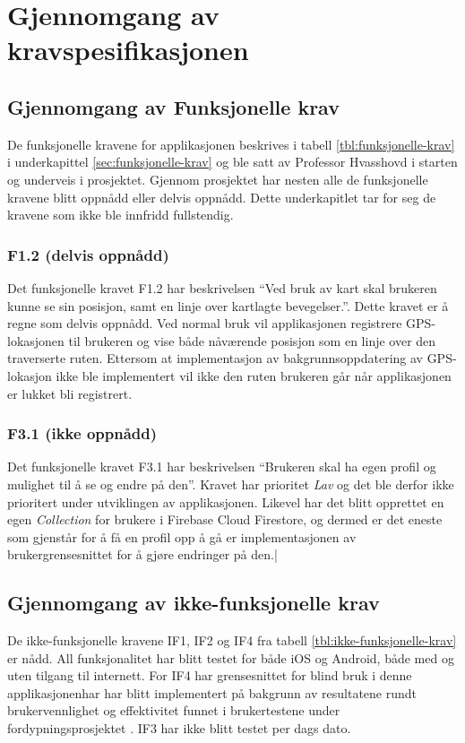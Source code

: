 \chapter{Gjennomgang av kravspesifikasjonen}

\section{Gjennomgang av Funksjonelle krav}
De funksjonelle kravene for applikasjonen beskrives i tabell \ref{tbl:funksjonelle-krav} i underkapittel \ref{sec:funksjonelle-krav}  og ble satt av Professor Hvasshovd i starten og underveis i prosjektet. Gjennom prosjektet har nesten alle de funksjonelle kravene blitt oppnådd eller delvis oppnådd. Dette underkapitlet tar for seg de kravene som ikke ble innfridd fullstendig.

\subsection{F1.2 (delvis oppnådd)}
Det funksjonelle kravet F1.2 har beskrivelsen \enquote{Ved bruk av kart skal brukeren kunne se sin posisjon, samt en linje over kartlagte bevegelser.}. Dette kravet er å regne som delvis oppnådd. Ved normal bruk vil applikasjonen registrere GPS-lokasjonen til brukeren og vise både nåværende posisjon som en linje over den traverserte ruten. Ettersom at implementasjon av bakgrunnsoppdatering av GPS-lokasjon ikke ble implementert vil ikke den ruten brukeren går når applikasjonen er lukket bli registrert.

\subsection{F3.1 (ikke oppnådd)}
Det funksjonelle kravet F3.1 har beskrivelsen \enquote{Brukeren skal ha egen profil og mulighet til å se og endre på den}. Kravet har prioritet \textit{Lav} og det ble derfor ikke prioritert under utviklingen av applikasjonen. Likevel har det blitt opprettet en egen \textit{Collection} for brukere i Firebase Cloud Firestore, og dermed er det eneste som gjenstår for å få en profil opp å gå er implementasjonen av brukergrensesnittet for å gjøre endringer på den.|

\section{Gjennomgang av ikke-funksjonelle krav}
De ikke-funksjonelle kravene IF1, IF2 og IF4 fra tabell \ref{tbl:ikke-funksjonelle-krav} er nådd. All funksjonalitet har blitt testet for både iOS og Android, både med og uten tilgang til internett. For IF4 har grensesnittet for blind bruk i denne applikasjonenhar har blitt implementert på bakgrunn av resultatene rundt brukervennlighet og effektivitet funnet i brukertestene under fordypningsprosjektet \cite[~s.64]{Abtahi2020TilsynBeite}. IF3 har ikke blitt testet per dags dato.